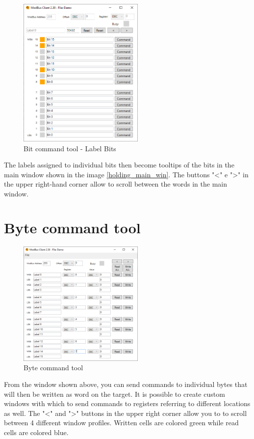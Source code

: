 \begin{figure}[H]
\centering
\includegraphics[width=0.55\textwidth]{../Img/Tool_Command_Bit_Label.PNG}
\caption{Bit command tool - Label Bits}
\end{figure}

The labels assigned to individual bits then become tooltips of the bits in the
main window shown in the image \ref{holding_main_win}.
The buttons "<" e ">" in the upper right-hand corner allow
to scroll between the words in the main window.

\section{Byte command tool}

\begin{figure}[H]
\centering
\includegraphics[width=0.55\textwidth]{../Img/Tool_Command_Byte.PNG}
\caption{Byte command tool}
\end{figure}

From the window shown above, you can send commands to individual bytes that will then be
written as word on the target. It is possible to create custom windows with which to send
commands to registers referring to different locations as well. The "<" and ">" buttons in the upper right corner allow you to
to scroll between 4 different window profiles.
Written cells are colored green while read cells are colored blue.


